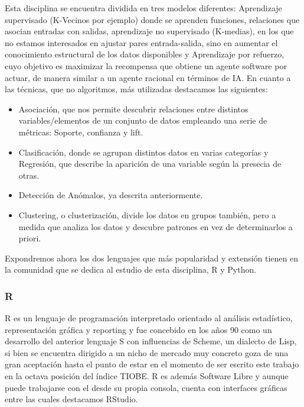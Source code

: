 \documentclass[11pt, a4paper]{article} %
\begin{document}
Esta disciplina se encuentra dividida en tres modelos diferentes: Aprendizaje supervisado (K-Vecinos por ejemplo) donde se aprenden funciones, relaciones que asocian entradas con salidas, aprendizaje no supervisado (K-medias), en los que no estamos interesados en ajustar pares entrada-salida, sino en aumentar el conocimiento estructural de los datos disponibles y Aprendizaje por refuerzo, cuyo objetivo es maximizar la recompensa que obtiene un agente software por actuar, de manera similar a un agente racional en términos de IA. En cuanto a las técnicas, que no algoritmos, más utilizadas destacamos las siguientes:
\begin{itemize}
\item Asociación, que nos permite descubrir relaciones entre distintos variables/elementos de un conjunto de datos empleando una serie de métricas: Soporte, confianza y lift.
\item Clasificación, donde se agrupan distintos datos en varias categorías y Regresión, que describe la aparición de una variable según la presecia de otras.
\item Detección de Anómalos, ya descrita anteriormente.
\item Clustering, o clusterización, divide los datos en grupos también, pero a medida que analiza los datos y descubre patrones en vez de determinarlos a priori.
\end{itemize}


Expondremos ahora los dos lenguajes que más popularidad y extensión tienen en la comunidad que se dedica al estudio de esta disciplina, R y Python.
\subsubsection{R}
R es un lenguaje de programación interpretado orientado al análisis estadístico, representación gráfica y reporting y fue concebido en los años 90 como un desarrollo del anterior lenguaje S con influencias de Scheme, un dialecto de Lisp, si bien se encuentra dirigido a un nicho de mercado muy concreto goza de una gran aceptación hasta el punto de estar en el momento de ser escrito este trabajo en la octava posición del índice TIOBE. R es además Software Libre y aunque puede trabajarse con el desde su propia consola, cuenta con interfaces gráficas entre las cuales destacamos RStudio. \cite{R} 
\end{document}
